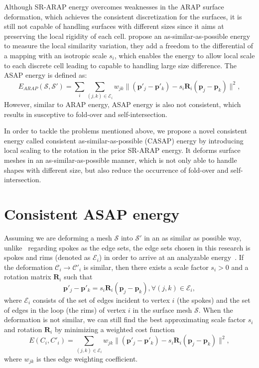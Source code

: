Although SR-ARAP energy overcomes weaknesses in the ARAP surface deformation, which achieves the consistent discretization for the surfaces, it is still not capable of handling surfaces with different sizes since it aims at preserving the local rigidity of each cell. \cite{yamazaki2013non} propose an as-similar-as-possible energy to measure the local similarity variation, they add a freedom to the differential of a mapping with an isotropic scale $s_i$, which enables the energy to allow local scale to each discrete cell leading to capable to handling large size difference. The ASAP energy is defined as:
\begin{equation}\label{easap}
E_{ARAP}(\mathcal S, \mathcal S')=\displaystyle \sum_i\!\!\sum_{(j,k)\in\mathcal{E}_i}\!\!\!w_{jk}\|(\mathbf p'_j - \mathbf p'_k)\!-\!s_i\mathbf R_i(\mathbf p_j - \mathbf p_k)\|^2,
\end{equation}
 However, similar to ARAP energy, ASAP energy is also not consistent, which results in susceptive to fold-over and self-intersection.

In order to tackle the problems mentioned above, we propose a novel consistent energy called consistent as-similar-as-possible (CASAP) energy by introducing local scaling to the rotation in the prior SR-ARAP energy. It deforms surface meshes in an as-similar-as-possible manner, which is not only able to handle shapes with different size, but also reduce the occurrence of fold-over and self-intersection.

\section{Consistent ASAP energy}
Assuming we are deforming a mesh $\mathcal S$ into $\mathcal S'$ in an as similar as possible way, unlike~\citep{sorkine2007rigid,yamazaki2013non,yoshiyasu2014conformal} regarding spokes as the edge sets, the edge sets chosen in this research is spokes and rims (denoted as $\mathcal{E}_i$) in order to arrive at an analyzable energy~\cite{chao2010simple}. If the deformation $\mathcal C_i \rightarrow \mathcal  C'_i$ is similar, then there exists a scale factor $s_i > 0$ and a rotation matrix $\mathbf R_i$ such that
\begin{equation}
\mathbf p'_j - \mathbf p'_k = s_i\mathbf R_i(\mathbf p_j - \mathbf p_k), \forall (j,k) \in \mathcal{E}_i,
\end{equation}
where $\mathcal{E}_i$ consists of the set of edges incident to vertex $i$ (the spokes) and the set of edges in the loop (the rims) of vertex $i$ in the surface mesh $\mathcal S$. When the deformation is not similar, we can still find the best approximating scale factor $s_i$ and rotation $\mathbf R_i$ by minimizing a weighted cost function
\begin{equation}
E(C_i,C'_i)=\sum_{(j,k)\in\mathcal{E}_i}w_{jk}\|(\mathbf  p'_j - \mathbf p'_k)-s_i\mathbf R_i(\mathbf  p_j - \mathbf p_k)\|^2,
\end{equation}
where $w_{jk}$ is thes edge weighting coefficient.

